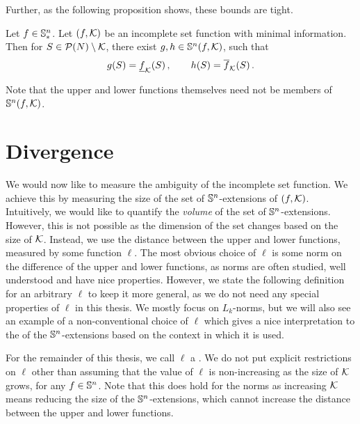 Further, as the following proposition shows, these bounds are tight.

\begin{prop}
  Let $ f \in \mathbb{S}^n_* $.
  Let $ \left( f, \mathcal{K} \right) $ be an incomplete set function with minimal information.
  Then for $ S \in \mathcal{P}\!\left(N\right) \setminus \mathcal{K} $, there exist $ g,h \in \mathbb{S}^n\!\left(f, \mathcal{K}\right) $, such that \[
    g\!\left(S\right) = \underline{f}_{\mathcal{K}}\!\left(S\right), \qquad h\!\left(S\right) = \overline{f}_{\mathcal{K}}\!\left(S\right).
  \]
\end{prop}

Note that the upper and lower functions themselves need not be members of $ \mathbb{S}^n\!\left(f, \mathcal{K}\right) $.

\section{Divergence}
\label{sec:divergence}

We would now like to measure the ambiguity of the incomplete set function.
We achieve this by measuring the size of the set of $ \mathbb{S}^n $-extensions of $ \left( f, \mathcal{K} \right) $.
Intuitively, we would like to quantify the \emph{volume} of the set of $ \mathbb{S}^n $-extensions.
However, this is not possible as the dimension of the set changes based on the size of $ \mathcal{K}$.
Instead, we use the distance between the upper and lower functions, measured by some function $ \ell $.
The most obvious choice of $ \ell $ is some norm on the difference of the upper and lower functions, as norms are often studied, well understood and have nice properties.
However, we state the following definition for an arbitrary $ \ell $ to keep it more general, as we do not need any special properties of $ \ell $ in this thesis.
We mostly focus on $ L_k $-norms, but we will also see an example of a non-conventional choice of $ \ell $ which gives a nice interpretation to the  of the $ \mathbb{S}^n $-extensions based on the context in which it is used.

For the remainder of this thesis, we call $ \ell $ a .
We do not put explicit restrictions on $ \ell $ other than assuming that the value of $ \ell $ is non-increasing as the size of $ \mathcal{K} $ grows, for any $f \in \mathbb{S}^n$.
Note that this does hold for the norms as increasing $ \mathcal{K} $ means reducing the size of the $ \mathbb{S}^n $-extensions, which cannot increase the distance between the upper and lower functions.

